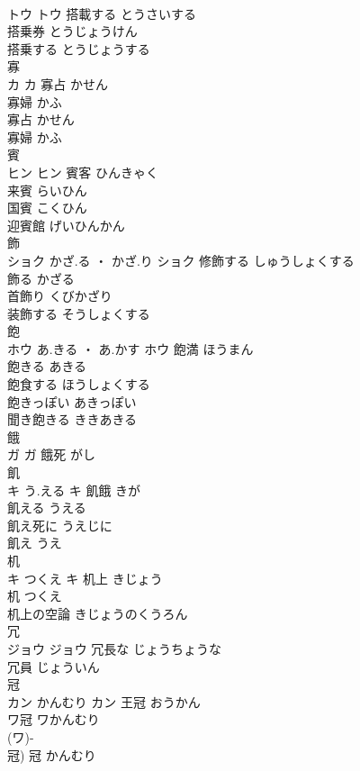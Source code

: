 \documentclass[8pt]{extreport}
\begin{document}
\begin{CJK}{UTF8}{min}
\\	トウ		トウ	搭載する	とうさいする	
\\	搭乗券	とうじょうけん	
\\	搭乗する	とうじょうする	
\\	寡	
\\	カ		カ	寡占	かせん	
\\	寡婦	かふ	
\\	寡占	かせん	
\\	寡婦	かふ	
\\	賓	
\\	ヒン		ヒン	賓客	ひんきゃく	
\\	来賓	らいひん	
\\	国賓	こくひん	
\\	迎賓館	げいひんかん	
\\	飾	
\\	ショク	かざ.る ・ かざ.り	ショク	修飾する	しゅうしょくする	
\\	飾る	かざる	
\\	首飾り	くびかざり	
\\	装飾する	そうしょくする	
\\	飽	
\\	ホウ	あ.きる ・ あ.かす	ホウ	飽満	ほうまん	
\\	飽きる	あきる	
\\	飽食する	ほうしょくする	
\\	飽きっぽい	あきっぽい	
\\	聞き飽きる	ききあきる	
\\	餓	
\\	ガ		ガ													餓死	がし	
\\	飢	
\\	キ	う.える	キ	飢餓	きが	
\\	飢える	うえる	
\\	飢え死に	うえじに	
\\	飢え	うえ	
\\	机	
\\	キ	つくえ	キ	机上	きじょう	
\\	机	つくえ	
\\	机上の空論	きじょうのくうろん	
\\	冗	
\\	ジョウ		ジョウ													冗長な	じょうちょうな	
\\	冗員	じょういん	
\\	冠	
\\	カン	かんむり	カン	王冠	おうかん	
\\	ワ冠	ワかんむり	
\\	(ワ)-
\\	冠)	冠	かんむり	

\end{CJK}
\end{document}

